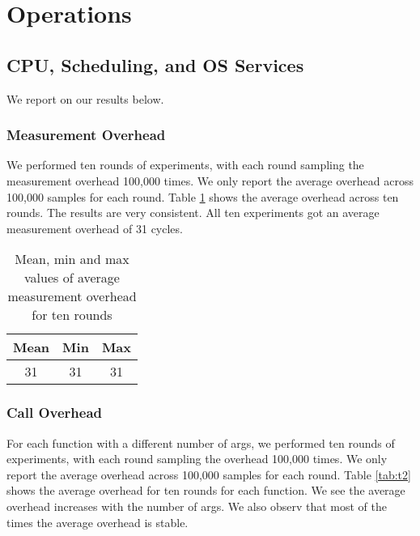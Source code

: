 \section{Operations}

\subsection{CPU, Scheduling, and OS Services}
We report on our results below.
\subsubsection{Measurement Overhead}
We performed ten rounds of experiments, with each round sampling the measurement overhead 100,000 times. We only report the average overhead across 100,000 samples for each round.
Table \ref{tab:t1} shows the average overhead across ten rounds. 
The results are very consistent.
All ten experiments got an average measurement overhead of 31 cycles.

\begin{table}[htb]

\caption{Mean, min and max values of average measurement overhead for ten rounds}

    \begin{tabular}{|c|c|c|} 
     \hline
     Mean & Min & Max \\ 
     \hline
     31 & 31 & 31 \\ 
     \hline
    \end{tabular}
    \label{tab:t1}
\end{table}

\subsubsection{Call Overhead}
For each function with a different number of args, we performed ten rounds of experiments, with each round sampling the overhead 100,000 times. We only report the average overhead across 100,000 samples for each round.
Table \ref{tab:t2} shows the average overhead for ten rounds for each function. 
We see the average overhead increases with the number of args. 
We also observ that most of the times the average overhead is stable.

